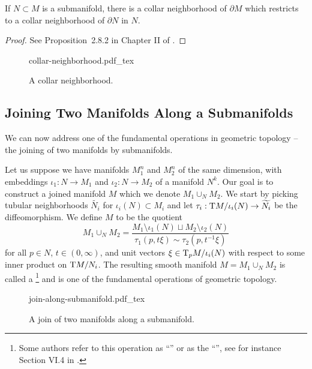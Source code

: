 \begin{proposition}
	If $N\subset M$ is a submanifold, there is a collar neighborhood of $\partial M$ which restricts to a collar neighborhood of $\partial N$ in $N$.
\end{proposition}
\begin{proof}
	See Proposition~2.8.2 in Chapter II of \cite{kosinski1993differential}.
\end{proof}

\begin{figure}[ht]
	\centering
	{collar-neighborhood.pdf_tex}
	\caption{A collar neighborhood.}\label{fig:collar-neighborhoods}
\end{figure}

\subsection{Joining Two Manifolds Along a Submanifolds}

We can now address one of the fundamental operations in geometric topology -- the joining of two manifolds by submanifolds.

Let us suppose we have manifolds $M_1^n$ and $M_2^n$ of the same dimension, with embeddings $\iota_1 : N\to M_1$ and $\iota_2 : N\to M_2$ of a manifold $N^k$. Our goal is to construct a joined manifold $M$ which we denote $M_1\cup_N M_2$.
We start by picking tubular neighborhoods $\widetilde{N_i}$ for $\iota_i(N)\subset M_i$ and let $\tau_i: \mathrm{T} M/\iota_i(N) \to \widetilde{N_i}$ be the diffeomorphism.
We define $M$ to be the quotient
\begin{equation}\label{eq:join-definition}
	M_1\cup_N M_2 = \frac{M_1\setminus \iota_1(N)\sqcup M_2\setminus \iota_2(N)}{\tau_1(p, t\xi) \sim \tau_2(p, t^{-1}\xi)}
\end{equation}
for all $p\in N$, $t\in(0,\infty)$, and unit vectors $\xi\in \mathrm{T}_p M/\iota_i(N)$ with respect to some inner product on $\mathrm{T} M/N_i$. The resulting smooth manifold $M=M_1\cup_N M_2$ is called a \footnote{Some authors refer to this operation as ``'' or as the ``'', see for instance Section VI.4 in \cite{kosinski1993differential}.} and is one of the fundamental operations of geometric topology.

\begin{figure}[ht]
	\centering
	{join-along-submanifold.pdf_tex}
	\caption{A join of two manifolds along a submanifold.}\label{fig:join-along-submanifold}
\end{figure}

